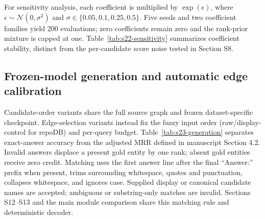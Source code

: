 \begin{revisionblock}
\begin{minipage}{\linewidth}
\end{minipage}\par\medskip



\par{}\noindent\begin{minipage}{\linewidth}

\centering\small\setlength{\tabcolsep}{4pt}
\label{tab:s21-ablation}


\end{minipage}\par\medskip

For sensitivity analysis, each coefficient is multiplied by $\exp(\epsilon)$, where $\epsilon\sim\mathcal{N}(0,\sigma^2)$ and $\sigma\in\{0.05,0.1,0.25,0.5\}$. Five seeds and two coefficient families yield 200 evaluations; zero coefficients remain zero and the rank-prior mixture is capped at one. Table~\ref{tab:s22-sensitivity} summarizes coefficient stability, distinct from the per-candidate score noise tested in Section S8.

\par{}\noindent\begin{minipage}{\linewidth}

\centering\small\setlength{\tabcolsep}{4pt}
\label{tab:s22-sensitivity}


\end{minipage}\par\medskip

\subsection{Frozen-model generation and automatic edge calibration}
Candidate-order variants share the full source graph and frozen dataset-specific checkpoint. Edge-selection variants instead fix the fuzzy input order (raw/display-control for repoDB) and per-query budget. Table~\ref{tab:s23-generation} separates exact-answer accuracy from the adjusted MRR defined in manuscript Section 4.2. Invalid answers displace a present gold entity by one rank; absent gold entities receive zero credit. Matching uses the first answer line after the final ``Answer:'' prefix when present, trims surrounding whitespace, quotes and punctuation, collapses whitespace, and ignores case. Supplied display or canonical candidate names are accepted; ambiguous or substring-only matches are invalid. Sections S12--S13 and the main module comparison share this matching rule and deterministic decoder.


\end{revisionblock}
